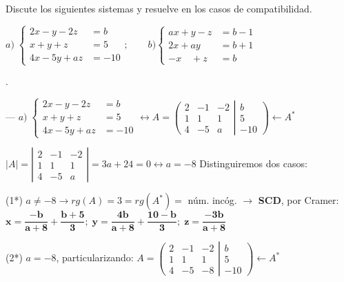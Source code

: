\begin{ejre}
	Discute los siguientes sistemas y resuelve en los casos de compatibilidad.

\noindent $a)\; \begin{cases} 2x-y-2z&=b\\ x+y+z&=5\\4x-5y+az&=-10 \end{cases}; \qquad b) \begin{cases} ax+y-z&=b-1\\2x+ay&=b+1\\-x\quad +z&=b \end{cases} $
\end{ejre}

\begin{proofw}\renewcommand{\qedsymbol}{$\diamond$}.

\noindent --- $a)\; \begin{cases} 2x-y-2z&=b\\ x+y+z&=5\\4x-5y+az&=-10 \end{cases}   \leftrightarrow A=\left( \begin{matrix}    2&-1&-2\\1&1&1\\4&-5&a    \end{matrix} \right|  \left.    \begin{matrix}  b\\5\\-10  \end{matrix} \right) \leftarrow A^*$

\noindent $|A|= \left| \begin{matrix}    2&-1&-2\\1&1&1\\4&-5&a    \end{matrix} \right|=  3a+24 =0 \leftrightarrow a=-8$ Distinguiremos dos casos:

\noindent (1*) $a\neq -8 \to rg(A)=3=rg(A^*)=$ núm. incóg. $\to$ \textbf{SCD}, por Cramer: $\boldsymbol{x=\dfrac{-b}{a+8}+\dfrac{b+5}{3}; \; y=\dfrac{4b}{a+8}+\dfrac{10-b}{3}; \; z=\dfrac{-3b}{a+8} }$

\noindent (2*) $a=-8$, particularizando: $A=\left( \begin{matrix}    \boxed{2}&\boxed{-1}&-2\\\boxed{1}&\boxed{1}&1\\4&-5&-8    \end{matrix} \right|  \left.    \begin{matrix}  b\\5\\-10  \end{matrix} \right) \leftarrow A^*$


\end{proofw}
